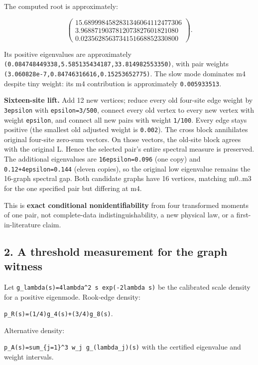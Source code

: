 \documentclass[
  10pt,
  a4paper,
]{article}
\begin{document}
The computed root is approximately:

\[
\begin{pmatrix}
15.6899984582831346064112477306\\
3.9688719037812073827601821080\\
0.0235628563734151668852330800
\end{pmatrix}.
\]

Its positive eigenvalues are approximately \texttt{(0.084748449338,5.585135434187,33.814982553350)}, with pair weights \texttt{(3.060828e-7,0.84746316616,0.15253652775)}. The slow mode dominates m4 despite tiny weight: its m4 contribution is approximately \texttt{0.005933513}.

\textbf{Sixteen-site lift.} Add 12 new vertices; reduce every old four-site edge weight by \texttt{3epsilon} with \texttt{epsilon=3/500}, connect every old vertex to every new vertex with weight \texttt{epsilon}, and connect all new pairs with weight \texttt{1/100}. Every edge stays positive (the smallest old adjusted weight is \texttt{0.002}). The cross block annihilates original four-site zero-sum vectors. On those vectors, the old-site block agrees with the original L. Hence the selected pair's entire spectral measure is preserved. The additional eigenvalues are \texttt{16epsilon=0.096} (one copy) and \texttt{0.12+4epsilon=0.144} (eleven copies), so the original low eigenvalue remains the 16-graph spectral gap. Both candidate graphs have 16 vertices, matching m0..m3 for the one specified pair but differing at m4.

This is \textbf{exact conditional nonidentifiability} from four transformed moments of one pair, not complete-data indistinguishability, a new physical law, or a first-in-literature claim.

\subsection{2. A threshold measurement for the graph witness}\label{a-threshold-measurement-for-the-graph-witness}

Let \texttt{g\_lambda(s)=4lambda\^{}2\ s\ exp(-2lambda\ s)} be the calibrated scale density for a positive eigenmode. Rook-edge density:

\texttt{p\_R(s)=(1/4)g\_4(s)+(3/4)g\_8(s)}.

Alternative density:

\texttt{p\_A(s)=sum\_\{j=1\}\^{}3\ w\_j\ g\_(lambda\_j)(s)} with the certified eigenvalue and weight intervals.
\end{document}
